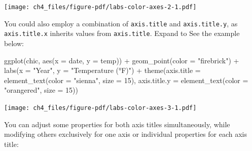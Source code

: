 \documentclass[
  letterpaper,
]{scrbook}
\newenvironment{Shaded}{\begin{snugshade}}{\end{snugshade}}
\newcommand{\AttributeTok}[1]{\textcolor[rgb]{0.40,0.45,0.13}{#1}}
\newcommand{\DecValTok}[1]{\textcolor[rgb]{0.68,0.00,0.00}{#1}}
\newcommand{\FunctionTok}[1]{\textcolor[rgb]{0.28,0.35,0.67}{#1}}
\newcommand{\NormalTok}[1]{\textcolor[rgb]{0.00,0.23,0.31}{#1}}
\newcommand{\SpecialCharTok}[1]{\textcolor[rgb]{0.37,0.37,0.37}{#1}}
\newcommand{\StringTok}[1]{\textcolor[rgb]{0.13,0.47,0.30}{#1}}
\begin{document}
\texttt{[image: ch4\_files/figure-pdf/labs-color-axes-2-1.pdf]}

\begin{tcolorbox}[enhanced jigsaw, toprule=.15mm, bottomtitle=1mm, coltitle=black, breakable, colbacktitle=quarto-callout-tip-color!10!white, opacityback=0, toptitle=1mm, colframe=quarto-callout-tip-color-frame, titlerule=0mm, title=\textcolor{quarto-callout-tip-color}{\faLightbulb}\hspace{0.5em}{Customising Invidual Axis}, bottomrule=.15mm, arc=.35mm, opacitybacktitle=0.6, leftrule=.75mm, left=2mm, rightrule=.15mm, colback=white]

You could also employ a combination of \texttt{axis.title} and
\texttt{axis.title.y}, as \texttt{axis.title.x} inherits values from
\texttt{axis.title}. Expand to See the example below:

\begin{Shaded}
\begin{Highlighting}[]
\FunctionTok{ggplot}\NormalTok{(chic, }\FunctionTok{aes}\NormalTok{(}\AttributeTok{x =}\NormalTok{ date, }\AttributeTok{y =}\NormalTok{ temp)) }\SpecialCharTok{+}
  \FunctionTok{geom\_point}\NormalTok{(}\AttributeTok{color =} \StringTok{"firebrick"}\NormalTok{) }\SpecialCharTok{+}
  \FunctionTok{labs}\NormalTok{(}\AttributeTok{x =} \StringTok{"Year"}\NormalTok{, }\AttributeTok{y =} \StringTok{"Temperature (°F)"}\NormalTok{) }\SpecialCharTok{+}
  \FunctionTok{theme}\NormalTok{(}\AttributeTok{axis.title =} \FunctionTok{element\_text}\NormalTok{(}\AttributeTok{color =} \StringTok{"sienna"}\NormalTok{, }\AttributeTok{size =} \DecValTok{15}\NormalTok{),}
        \AttributeTok{axis.title.y =} \FunctionTok{element\_text}\NormalTok{(}\AttributeTok{color =} \StringTok{"orangered"}\NormalTok{, }\AttributeTok{size =} \DecValTok{15}\NormalTok{))}
\end{Highlighting}
\end{Shaded}

\texttt{[image: ch4\_files/figure-pdf/labs-color-axes-3-1.pdf]}

\end{tcolorbox}

You can adjust some properties for both axis titles simultaneously,
while modifying others exclusively for one axis or individual properties
for each axis title:
\end{document}
